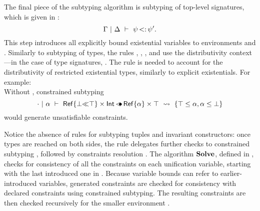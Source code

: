 The final piece of the subtyping algorithm is subtyping of top-level signatures,
which is given in :
\[
    \Gamma~\vert~\Delta\ \vdash\ \psi \operatorname{<:} \psi'.
\]
This step introduces all explicitly bound existential variables to
environments \AEnv and \UEnv.
Similarly to subtyping of types, the rules , ,
, and  use the distributivity context---in
the case of type signatures, \dctxsig.
The rule  is needed to account for the distributivity of restricted
existential types, similarly to explicit existentials. For example:\\
Without , constrained subtyping
\[
    \cdot~\vert~\alpha\ \vdash\ \mathsf{Ref}\{\bot{\operatorname{\ll}}\top\} \times \mathsf{Int} \operatorname{\lessdot\!\!\bullet} \mathsf{Ref}\{\alpha\} \times \top\ \rightsquigarrow\  \{\top \leq \alpha, \alpha \leq \bot\} 
\]
would generate unsatisfiable constraints.

Notice the absence of rules for subtyping tuples and invariant constructors:
once types are reached on both sides, the rule  delegates further
checks to constrained subtyping ,
followed by constraints resolution \solvectrdflt.
The algorithm $\operatorname{\mathbf{Solve}}$, defined in , 
checks for consistency of all the constraints on each
unification variable, starting with the last introduced one in \UEnv.
Because variable bounds can refer to earlier-introduced variables,
generated constraints are checked for consistency with declared constraints
using constrained subtyping. The resulting constraints are then checked
recursively for the smaller environment \UEnv.

